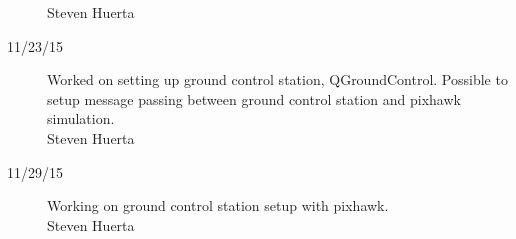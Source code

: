\begin{description}
\hfill{Steven Huerta}

\item [11/23/15] Worked on setting up ground control station, QGroundControl. Possible to setup message passing between ground control station and pixhawk simulation.\\

\hfill{Steven Huerta}


\item [11/29/15] Working on ground control station setup with pixhawk.\\

\hfill{Steven Huerta}

\end{description}